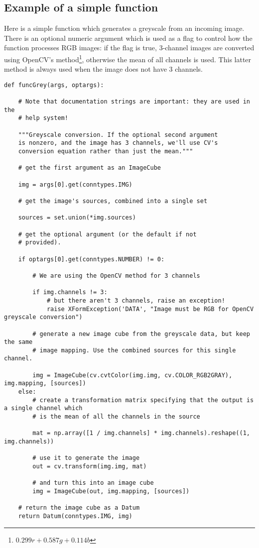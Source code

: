 \subsection{Example of a simple function}
Here is a simple function which generates a greyscale from an incoming image. There is an optional
numeric argument which is used as a flag to control how the function processes RGB images:
if the flag is true, 3-channel images are converted using OpenCV's
method\footnote{$0.299r + 0.587g + 0.114b$},
otherwise the mean of all channels is used. This latter method is always used when the image does not have
3 channels.

\begin{lstlisting}
def funcGrey(args, optargs):

    # Note that documentation strings are important: they are used in the
    # help system!
    
    """Greyscale conversion. If the optional second argument
    is nonzero, and the image has 3 channels, we'll use CV's
    conversion equation rather than just the mean."""

    # get the first argument as an ImageCube
    
    img = args[0].get(conntypes.IMG)
    
    # get the image's sources, combined into a single set
    
    sources = set.union(*img.sources)

    # get the optional argument (or the default if not
    # provided).
    
    if optargs[0].get(conntypes.NUMBER) != 0:

        # We are using the OpenCV method for 3 channels
        
        if img.channels != 3:
            # but there aren't 3 channels, raise an exception!
            raise XFormException('DATA', "Image must be RGB for OpenCV greyscale conversion")

        # generate a new image cube from the greyscale data, but keep the same
        # image mapping. Use the combined sources for this single channel.

        img = ImageCube(cv.cvtColor(img.img, cv.COLOR_RGB2GRAY), img.mapping, [sources])
    else:
        # create a transformation matrix specifying that the output is a single channel which
        # is the mean of all the channels in the source
        
        mat = np.array([1 / img.channels] * img.channels).reshape((1, img.channels))

        # use it to generate the image
        out = cv.transform(img.img, mat)

        # and turn this into an image cube
        img = ImageCube(out, img.mapping, [sources])
    
    # return the image cube as a Datum
    return Datum(conntypes.IMG, img)
\end{lstlisting}

